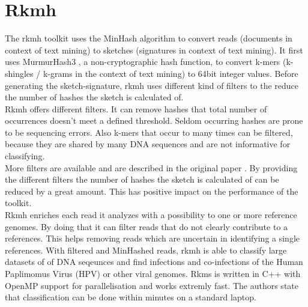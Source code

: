 \newpage

\section{Rkmh}

The rkmh toolkit uses the MinHash algorithm to convert reads (documents in context of text mining) to sketches (signatures in context of text mining). It first uses MurmurHash3 \cite{murmurHash}, a non-cryptographic hash function, to convert k-mers (k-shingles / k-grams in the context of text mining) to 64bit integer values. Before generating the sketch-signature, rkmh uses different kind of filters to the reduce the number of hashes the sketch is calculated of.\\

Rkmh offers different filters. It can remove hashes that total number of occurrences doesn't meet a defined threshold. Seldom occurring hashes are prone to be sequencing errors. Also k-mers that occur to many times can be filtered, because they are shared by many DNA sequences and are not informative for classifying.\\

More filters are available and are described in the original paper \cite{rkmh}. By providing the different filters the number of hashes the sketch is calculated of can be reduced by a great amount. This has positive impact on the performance of the toolkit.\\

Rkmh enriches each read it analyzes with a possibility to one or more reference genomes. By doing that it can filter reads that do not clearly contribute to a references. This helps removing reads which are uncertain in identifying a single references. With filtered and MinHashed reads, rkmh is able to classify large datasets of of DNA seqeunces and find infections and co-infections of the Human Paplimomus Virus (HPV) or other viral genomes. Rkms is written in C++ with OpenMP \cite{openMP} support for parallelisation and works extremly fast. The authors state that classification can be done within minutes on a standard laptop.